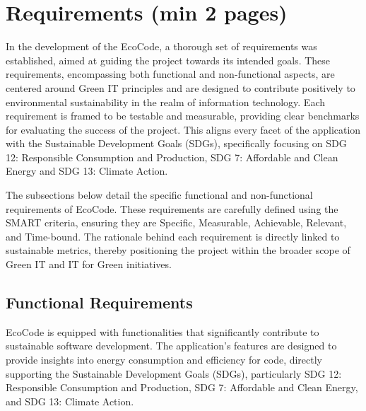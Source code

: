 \documentclass[conference,compsoc]{IEEEtran}
\begin{document}
\section{Requirements (min 2 pages)}
In the development of the EcoCode, a thorough set of requirements was established, aimed at guiding the project towards its intended goals. These requirements, encompassing both functional and non-functional aspects, are centered around Green IT principles and are designed to contribute positively to environmental sustainability in the realm of information technology. Each requirement is framed to be testable and measurable, providing clear benchmarks for evaluating the success of the project. This aligns every facet of the application with the Sustainable Development Goals (SDGs), specifically focusing on SDG 12: Responsible Consumption and Production, SDG 7: Affordable and Clean Energy and SDG 13: Climate Action.

The subsections below detail the specific functional and non-functional requirements of EcoCode. These requirements are carefully defined using the SMART criteria, ensuring they are Specific, Measurable, Achievable, Relevant, and Time-bound. The rationale behind each requirement is directly linked to sustainable metrics, thereby positioning the project within the broader scope of Green IT and IT for Green initiatives.

\subsection{Functional Requirements}
EcoCode is equipped with functionalities that significantly contribute to sustainable software development. The application's features are designed to provide insights into energy consumption and efficiency for code, directly supporting the Sustainable Development Goals (SDGs), particularly SDG 12: Responsible Consumption and Production, SDG 7: Affordable and Clean Energy, and SDG 13: Climate Action.
\end{document}
